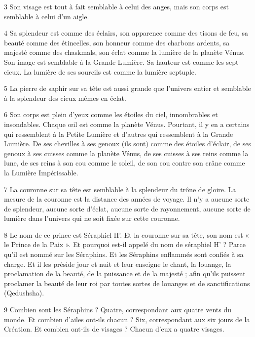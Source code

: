 \par 3 Son visage est tout à fait semblable à celui des anges, mais son corps est semblable à celui d'un aigle.

\par 4 Sa splendeur est comme des éclairs, son apparence comme des tisons de feu, sa beauté comme des étincelles, son honneur comme des charbons ardents, sa majesté comme des chaskmals, son éclat comme la lumière de la planète Vénus. Son image est semblable à la Grande Lumière. Sa hauteur est comme les sept cieux. La lumière de ses sourcils est comme la lumière septuple.

\par 5 La pierre de saphir sur sa tête est aussi grande que l'univers entier et semblable à la splendeur des cieux mêmes en éclat.

\par 6 Son corps est plein d'yeux comme les étoiles du ciel, innombrables et insondables. Chaque œil est comme la planète Vénus. Pourtant, il y en a certains qui ressemblent à la Petite Lumière et d’autres qui ressemblent à la Grande Lumière. De ses chevilles à ses genoux (ils sont) comme des étoiles d'éclair, de ses genoux à ses cuisses comme la planète Vénus, de ses cuisses à ses reins comme la lune, de ses reins à son cou comme le soleil, de son cou contre son crâne comme la Lumière Impérissable.

\par 7 La couronne sur sa tête est semblable à la splendeur du trône de gloire. La mesure de la couronne est la distance des années de voyage. Il n’y a aucune sorte de splendeur, aucune sorte d’éclat, aucune sorte de rayonnement, aucune sorte de lumière dans l’univers qui ne soit fixée sur cette couronne.

\par 8 Le nom de ce prince est Séraphiel H'. Et la couronne sur sa tête, son nom est « le Prince de la Paix ». Et pourquoi est-il appelé du nom de séraphiel H' ? Parce qu'il est nommé sur les Séraphins. Et les Séraphins enflammés sont confiés à sa charge. Et il les préside jour et nuit et leur enseigne le chant, la louange, la proclamation de la beauté, de la puissance et de la majesté ; afin qu'ils puissent proclamer la beauté de leur roi par toutes sortes de louanges et de sanctifications (Qedushsha).

\par 9 Combien sont les Séraphins ? Quatre, correspondant aux quatre vents du monde. Et combien d’ailes ont-ils chacun ? Six, correspondant aux six jours de la Création. Et combien ont-ils de visages ? Chacun d’eux a quatre visages.

